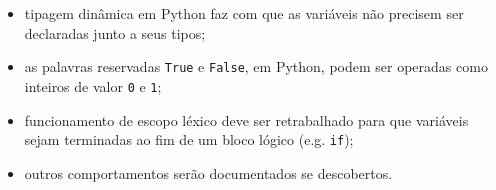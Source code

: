 \documentclass{sftex/sftex}
\newenvironment{smallitem}{
    \vspace{-1mm}
    \begin{itemize}
    \setlength{\parskip}{0pt}
    \setlength{\itemsep}{2pt}
}{
    \vspace{-2mm}
    \end{itemize}
}
\begin{document}
\begin{smallitem}
    \item tipagem dinâmica em Python faz com que as variáveis não precisem ser
        declaradas junto a seus tipos;
    \item as palavras reservadas \verb!True! e \verb!False!, em Python,
        podem ser operadas como inteiros de valor \verb!0! e \verb!1!;
    \item funcionamento de escopo léxico deve ser retrabalhado para que
        variáveis sejam terminadas ao fim de um bloco lógico (e.g. \verb!if!);
    \item outros comportamentos serão documentados se descobertos.
\end{smallitem}
\end{document}
